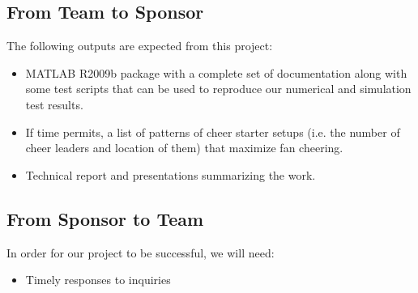 \documentclass[12pt,letterpaper]{article}
\theoremstyle{definition}
\begin{document}
\subsection{From Team to Sponsor} %
The following outputs are expected from this project:
\begin{itemize}
    \item MATLAB R2009b package with a complete set of documentation along with some test 
        scripts that can be used to reproduce our numerical and simulation test
        results.
    \item If time permits, a list of patterns of cheer starter setups (i.e. the number of cheer leaders and location of them) that maximize fan cheering.
    \item Technical report and presentations summarizing the work. 
\end{itemize}

\subsection{From Sponsor to Team} %

In order for our project to be successful, we will need:
\begin{itemize}
    \item Timely responses to inquiries 
\end{itemize}


\newpage



%
\end{document}
